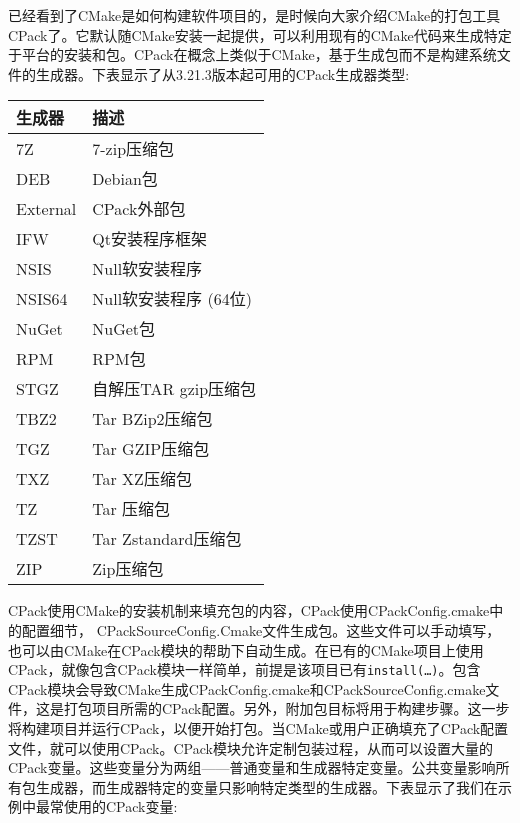 已经看到了CMake是如何构建软件项目的，是时候向大家介绍CMake的打包工具CPack了。它默认随CMake安装一起提供，可以利用现有的CMake代码来生成特定于平台的安装和包。CPack在概念上类似于CMake，基于生成包而不是构建系统文件的生成器。下表显示了从3.21.3版本起可用的CPack生成器类型:

\begin{table}[H]
	\centering
	\begin{tabular}{|l|l|}
		\hline
		\textbf{生成器}    & \textbf{描述}             \\ \hline
		7Z                 & 7-zip压缩包                    \\ \hline
		DEB                & Debian包                   \\ \hline
		External           & CPack外部包           \\ \hline
		IFW                & Qt安装程序框架           \\ \hline
		NSIS               & Null软安装程序              \\ \hline
		NSIS64             & Null软安装程序 (64位)      \\ \hline
		NuGet              & NuGet包                   \\ \hline
		RPM                & RPM包                      \\ \hline
		STGZ               & 自解压TAR gzip压缩包 \\ \hline
		TBZ2               & Tar BZip2压缩包                \\ \hline
		TGZ                & Tar GZIP压缩包                 \\ \hline
		TXZ                & Tar XZ压缩包                   \\ \hline
		TZ                 & Tar 压缩包             \\ \hline
		TZST               & Tar Zstandard压缩包           \\ \hline
		ZIP                & Zip压缩包                      \\ \hline
	\end{tabular}
\end{table}

CPack使用CMake的安装机制来填充包的内容，CPack使用CPackConfig.cmake中的配置细节， CPackSourceConfig.Cmake文件生成包。这些文件可以手动填写，也可以由CMake在CPack模块的帮助下自动生成。在已有的CMake项目上使用CPack，就像包含CPack模块一样简单，前提是该项目已有\texttt{install(…)}。包含CPack模块会导致CMake生成CPackConfig.cmake和CPackSourceConfig.cmake文件，这是打包项目所需的CPack配置。另外，附加包目标将用于构建步骤。这一步将构建项目并运行CPack，以便开始打包。当CMake或用户正确填充了CPack配置文件，就可以使用CPack。CPack模块允许定制包装过程，从而可以设置大量的CPack变量。这些变量分为两组——普通变量和生成器特定变量。公共变量影响所有包生成器，而生成器特定的变量只影响特定类型的生成器。下表显示了我们在示例中最常使用的CPack变量:

